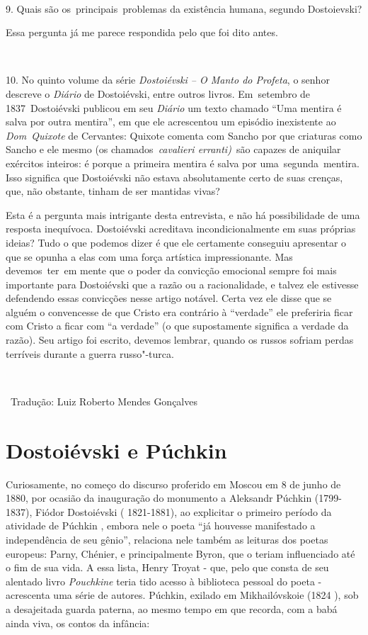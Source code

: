~

9. Quais são os~principais~problemas da existência humana, segundo
Dostoievski?

Essa pergunta já me parece respondida pelo que foi dito antes.

~

10. No quinto volume da série \emph{Dostoiévski -- O Manto do Profeta}, o
senhor descreve o \emph{Diário} de Dostoiévski, entre outros livros.
Em~setembro de 1837~Dostoiévski publicou em seu \emph{Diário} um texto
chamado ``Uma mentira é salva por outra mentira'', em que ele acrescentou
um episódio inexistente ao \emph{Dom~Quixote} de Cervantes: Quixote comenta
com Sancho por que criaturas como Sancho e ele mesmo (os
chamados~\emph{cavalieri erranti)~}são capazes de aniquilar exércitos
inteiros: é porque a primeira mentira é salva por uma~segunda~mentira.
Isso significa que Dostoiévski não estava absolutamente certo de suas
crenças, que, não obstante, tinham de ser mantidas vivas?

Esta é a pergunta mais intrigante desta entrevista, e não há
possibilidade de uma resposta inequívoca. Dostoiévski acreditava
incondicionalmente em suas próprias ideias? Tudo o que podemos dizer é
que ele certamente conseguiu apresentar o que se opunha a elas com uma
força artística impressionante. Mas devemos~ter~em mente que o poder da
convicção emocional sempre foi mais importante para Dostoiévski que a
razão ou a racionalidade, e talvez ele estivesse defendendo essas
convicções nesse artigo notável. Certa vez ele disse que se alguém o
convencesse de que Cristo era contrário à ``verdade'' ele preferiria ficar
com Cristo a ficar com ``a verdade'' (o que supostamente significa a
verdade da razão). Seu artigo foi escrito, devemos lembrar, quando os
russos sofriam perdas terríveis durante a guerra russo"-turca.

~

~Tradução: Luiz Roberto Mendes Gonçalves

\chapter{Dostoiévski e Púchkin}

Curiosamente, no começo do discurso proferido em Moscou em 8 de junho de
1880, por ocasião da inauguração do monumento a Aleksandr Púchkin
(1799-1837), Fiódor Dostoiévski ( 1821-1881), ao explicitar o primeiro
período da atividade de Púchkin , embora nele o poeta ``já houvesse
manifestado a independência de seu gênio'', relaciona nele também as
leituras dos poetas europeus: Parny, Chénier, e principalmente Byron,
que o teriam influenciado até o fim de sua vida. A essa lista, Henry
Troyat - que, pelo que consta de seu alentado livro \emph{Pouchkine}
teria tido acesso à biblioteca pessoal do poeta - acrescenta uma série
de autores. Púchkin, exilado em Mikhailóvskoie (1824 ), sob a
desajeitada guarda paterna, ao mesmo tempo em que recorda, com a babá
ainda viva, os contos da infância:

